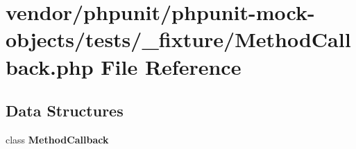 \section{vendor/phpunit/phpunit-\/mock-\/objects/tests/\+\_\+fixture/\+Method\+Callback.php File Reference}
\label{_method_callback_8php}
\subsection*{Data Structures}
\begin{DoxyCompactItemize}
\item 
class {\bf Method\+Callback}
\end{DoxyCompactItemize}
